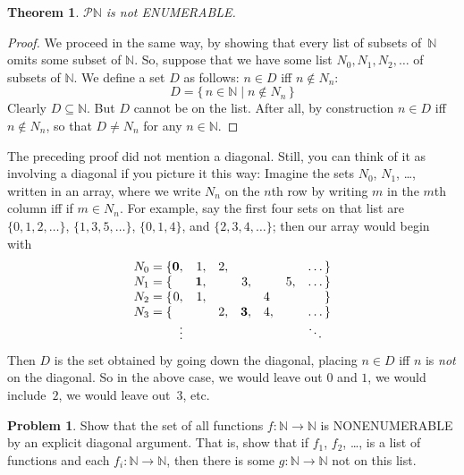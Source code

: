 \documentclass[10pt,a4paper]{article}
\newcommand*{\olup}[1]{\MakeUppercase{#1}}
\theoremstyle{plain}
\newtheorem{thm}{Theorem}[section]
\theoremstyle{definition}
\newtheorem{prob}{Problem}[section]
\theoremstyle{remark}
\newenvironment{explain}{}{}
\newcommand*{\ollabel}[1]{\label{#1}}
\providecommand{\Nat}{\ensuremath{\mathbb{N}}}
\providecommand{\Pow}{\mathcal{P}}
\providecommand{\Setabs}[2]{\{\, #1 \mid #2 \,\}}
\begin{document}
\begin{thm}
\ollabel{thm:nonenum-pownat}
$\Pow{\Nat}$ is not \olup{enumerable}.
\end{thm}

\begin{proof}
We proceed in the same way, by showing that every list of subsets
of~$\Nat$ omits some subset of $\Nat$. So, suppose that we have some
list $N_0, N_1, N_2, \ldots$ of subsets of $\Nat$. We define a set $D$
as follows: $n \in D$ iff $n \notin N_{n}$:
\[
D = \Setabs{n \in \Nat}{n \notin N_n}
\]
Clearly $D\subseteq \Nat$. But $D$ cannot be on the list. After all,
by construction $n \in D$ iff $n\notin N_n$, so that $D \neq N_n$ for
any $n \in \Nat$. 
\end{proof}

\begin{explain}
The preceding proof did not mention a diagonal. Still, you can think
of it as involving a diagonal if you picture it this way: Imagine the
sets $N_0$, $N_1$, \dots, written in an array, where we write $N_n$ on
the $n$th row by writing $m$ in the $m$th column iff if $m \in N_n$.
For example, say the first four sets on that list are
$\{0,1,2,\dots\}$, $\{1, 3, 5, \dots\}$, $\{0,1,4\}$, and
$\{2,3,4,\dots\}$; then our array would begin with
\[
\begin{array}{r@{}rrrrrrr}
  N_0 = \{ & \mathbf{0}, & 1, & 2, & & & & \dots\}\\
  N_1 = \{ &  & \mathbf{1}, &  & 3, &  & 5, & \dots\}\\
  N_2 = \{ & 0, & 1, &  &  & 4\phantom{,} &  & \}\\
  N_3 = \{ &  &  & 2, & \mathbf{3}, & 4, & & \dots\}\\
  &\vdots & & & & & & \ddots\phantom{\}}
  \end{array}
\]
Then $D$ is the set obtained by going down the diagonal, placing $n
\in D$ iff $n$ is \emph{not} on the diagonal. So in the above case, we
would leave out $0$ and $1$, we would include~$2$, we would leave
out~$3$, etc.
\end{explain}

\begin{prob}
Show that the set of all functions $f \colon \Nat \to \Nat$ is
\olup{nonenumerable} by an explicit diagonal argument. That is, show that
if $f_1$, $f_2$, \dots, is a list of functions and each $f_i\colon
\Nat \to \Nat$, then there is some $g \colon \Nat \to
\Nat$ not on this list.
\end{prob}

\end{document}
